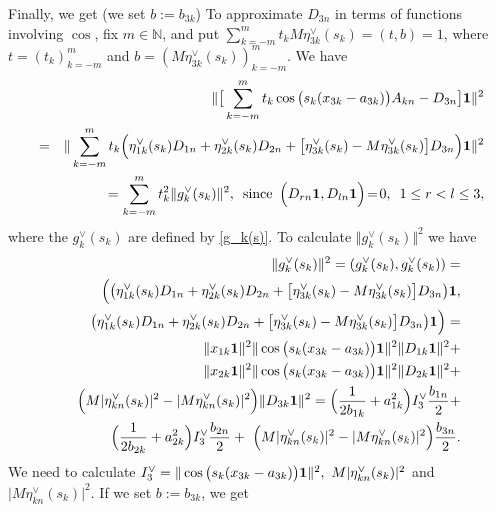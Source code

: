 \documentclass[preprint,12pt]{elsarticle}
\numberwithin{equation}{section}
\begin{document}
\begin{pf}
Finally, we get (we set $b:=b_{3k}$)
To approximate $D_{3n}$ 
in terms of functions involving  $\cos$,
fix $m\in {\mathbb N}$, 
and put $\sum_{k=-m}^mt_kM\eta^{\vee}_{3k}(s_k)=(t,b)=1$,
where $t=(t_k)_{k=-m}^m$ and $b=(M\eta^{\vee}_{3k}(s_k))_{k=-m}^m$. We have
%
\begin{eqnarray}
\nonumber
&& \Vert \big[\sum_{k=-m}^mt_k
\cos\big(s_k(x_{3k}-a_{3k})\big)A_{kn}
-D_{3n}\big]{\bf 1}
\Vert^2\\
\nonumber
&=&
\Vert 
\sum_{k=-m}^mt_k
\Big(\eta^{\vee}_{1k}(s_k)D_{1n}+\eta^{\vee}_{2k}(s_k)D_{2n}+\big[\eta^{\vee}_{3k}(s_k)-M\eta^{\vee}_{3k}(s_k)\big]D_{3n}\Big){\bf 1}
\Vert^2
\\
\label{eta^v.3.2}
&&
=\sum_{k=-m}^mt^2_k\Vert g^{\vee}_{k}(s_k)\Vert^2,\,\,\,\text{since}\,\,\,
\Big(D_{rn}{\bf 1},D_{ln}{\bf 1}\Big)\!=\!0,\,\,\,1\leq r<l\leq 3,
\end{eqnarray} 
where the $g^{\vee}_k(s_k)$ are defined by \eqref{g_k(s)}.
To calculate $\Vert g^{\vee}_{k}(s_k)\Vert^2$ we have
\begin{eqnarray}
\nonumber
&&
\Vert g^{\vee}_{k}(s_k)\Vert^2=(g^{\vee}_{k}(s_k),g^{\vee}_{k}(s_k))=\\
\nonumber
&&\Big(\big(\eta^{\vee}_{1k}(s_k)D_{1n}+\eta^{\vee}_{2k}(s_k)D_{2n}+\big[\eta^{\vee}_{3k}(s_k)-M\eta^{\vee}_{3k}(s_k)\big]D_{3n}\big){\bf 1},\\
\nonumber
&&\big(\eta^{\vee}_{1k}(s_k)D_{1n}+\eta^{\vee}_{2k}(s_k)D_{2n}+\big[\eta^{\vee}_{3k}(s_k)-M\eta^{\vee}_{3k}(s_k)\big]D_{3n}\big){\bf 1}\Big)=\\
\nonumber
&&
\Vert x_{1k}{\bf 1}\Vert^2
\Vert 
\cos\big(s_k(x_{3k}-a_{3k})\big){\bf 1}\Vert^2
\Vert D_{1k}{\bf 1}\Vert^2+\\
\nonumber
&&
\Vert x_{2k}{\bf 1}\Vert^2
\Vert \cos\big(s_k(x_{3k}-a_{3k})\big){\bf 1}\Vert^2
\Vert D_{2k}{\bf 1}\Vert^2+\\
\nonumber
&&
 \Big(M\vert\eta^{\vee}_{kn}(s_k)\vert^2-\vert M\eta^{\vee}_{kn}(s_k)\vert^2\Big)
\Vert D_{3k}{\bf 1}\Vert^2=
\Big(\frac{1}{2b_{1k}}+a^2_{1k}\Big)I^{\vee}_3\frac{b_{1n}}{2}+
\\
\label{norm(g^v_k).2}
&&
\Big(\frac{1}{2b_{2k}}+a^2_{2k}\Big)I^{\vee}_3\frac{b_{2n}}{2}+
 \Big(M\vert\eta^{\vee}_{kn}(s_k)\vert^2-\vert M\eta^{\vee}_{kn}(s_k)\vert^2\Big)\frac{b_{3n}}{2}.
\end{eqnarray}
We need to calculate $I^{\vee}_3=\Vert \cos\big(s_k(x_{3k}-a_{3k})\big){\bf 1}\Vert^2,\,\,M\vert\eta^{\vee}_{kn}(s_k)\vert^2$ and $\vert M\eta^{\vee}_{kn}(s_k)\vert^2$.
If we  set $b:=b_{3k}$, we get

\end{pf}
\end{document}
